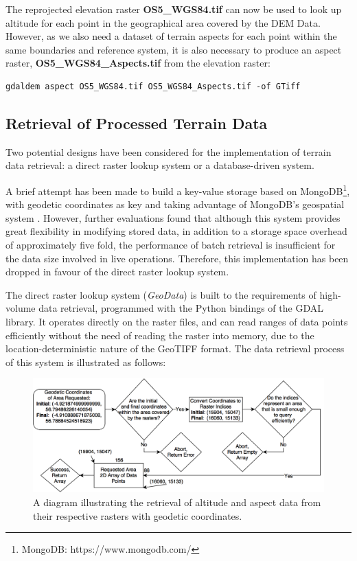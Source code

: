 \documentclass[11pt, oneside]{article}
\begin{document}
		The reprojected elevation raster \textbf{OS5\_WGS84.tif} can now be used to look up altitude for each point in the geographical area covered by the DEM Data. However, as we also need a dataset of terrain aspects for each point within the same boundaries and reference system, it is also necessary to produce an aspect raster, \textbf{OS5\_WGS84\_Aspects.tif} from the elevation raster:
		\begin{lstlisting}[breaklines]
gdaldem aspect OS5_WGS84.tif OS5_WGS84_Aspects.tif -of GTiff
		\end{lstlisting}
		
	\subsection{Retrieval of Processed Terrain Data} \label{subsec:rasterretrieval}
		Two potential designs have been considered for the implementation of terrain data retrieval: a direct raster lookup system or a database-driven system. 
		
		A brief attempt has been made to build a key-value storage based on MongoDB\footnote{MongoDB: https://www.mongodb.com/}, with geodetic coordinates as key and taking advantage of MongoDB's geospatial system \cite{mongodb-spatial}. However, further evaluations found that although this system provides great flexibility in modifying stored data, in addition to a storage space overhead of approximately five fold, the performance of batch retrieval is insufficient for the data size involved in live operations. Therefore, this implementation has been dropped in favour of the direct raster lookup system.
		
		The direct raster lookup system (\textit{GeoData}) is built to the requirements of high-volume data retrieval, programmed with the Python bindings of the GDAL library. It operates directly on the raster files, and can read ranges of data points efficiently without the need of reading the raster into memory, due to the location-deterministic nature of the GeoTIFF format.  The data retrieval process of this system is illustrated as follows:
		\begin{figure}[h]
		\centering
		\includegraphics[scale=0.3]{Retrieval.png}
		\caption{\label{fig:retrieval}A diagram illustrating the retrieval of altitude and aspect data from their respective rasters with geodetic coordinates.}
		\end{figure}
		
\end{document}
